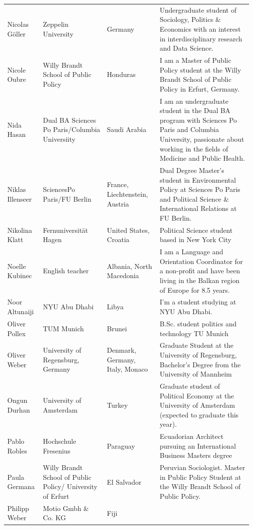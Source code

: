 \documentclass[]{article}
\begin{document}
\begin{longtable}{l>{\raggedright\arraybackslash}p{2cm}>{\raggedright\arraybackslash}p{2cm}>{\raggedright\arraybackslash}p{3cm}}
\addlinespace
Nicolas Göller & Zeppelin University & Germany & Undergraduate student of Sociology, Politics \& Economics with an interest in interdisciplinary research and Data Science.\\
\rowcolor{gray!6}  Nicole Oubre & Willy Brandt School of Public Policy & Honduras & I am a Master of Public Policy student at the Willy Brandt School of Public Policy in Erfurt, Germany.\\
Nida Hasan & Dual BA Sciences Po Paris/Columbia Universiity & Saudi Arabia & I am an undergraduate student in the Dual BA program with Sciences Po Paris and Columbia University, passionate about working in the fields of Medicine and Public Health.\\
\rowcolor{gray!6}  Niklas Illenseer & SciencesPo Paris/FU Berlin & France, Liechtenstein, Austria & Dual Degree Master's student in Environmental Policy at Sciences Po Paris and Political Science \& International Relations at FU Berlin.\\
Nikolina Klatt & Fernuniversität Hagen & United States, Croatia & Political Science student based in New York City\\
\addlinespace
\rowcolor{gray!6}  Noelle Kubinec & English teacher & Albania, North Macedonia & I am a Language and Orientation Coordinator for a non-profit and have been living in the Balkan region of Europe for 8.5 years.\\
Noor Altunaiji & NYU Abu Dhabi & Libya & I'm a student studying at NYU Abu Dhabi.\\
\rowcolor{gray!6}  Oliver Pollex & TUM Munich & Brunei & B.Sc. student politics and technology TU Munich\\
Oliver Weber & University of Regensburg, Germany & Denmark, Germany, Italy, Monaco & Graduate Student at the University of Regensburg, Bachelor's Degree from the University of Mannheim\\
\rowcolor{gray!6}  Ongun Durhan & University of Amsterdam & Turkey & Graduate student of Political Economy at the University of Amsterdam (expected to graduate this year).\\
\addlinespace
Pablo Robles & Hochschule Fresenius & Paraguay & Ecuadorian Architect pursuing an International Business Masters degree\\
\rowcolor{gray!6}  Paula Germana & Willy Brandt School of Public Policy/ University of Erfurt & El Salvador & Peruvian Sociologist. Master in Public Policy Student at the Willy Brandt School of Public Policy.\\
Philipp Weber & Motio Gmbh \& Co. KG & Fiji & \\

\end{longtable}
\end{document}
